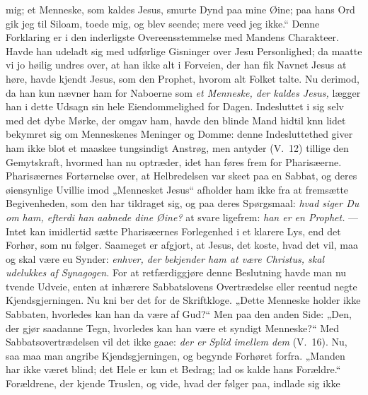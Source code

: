 \documentclass[12pt,a4paper]{book}
\begin{document}
mig; et Menneske, som kaldes Jesus, smurte Dynd paa mine Øine; paa hans Ord gik jeg til
Siloam, toede mig, og blev seende; mere veed jeg ikke.“ Denne Forklaring er i den
inderligste Overeensstemmelse med Mandens Charakteer. Havde han udeladt sig med udførlige
Gisninger over Jesu Personlighed; da maatte vi jo høilig undres over, at han ikke alt i
Forveien, der han fik Navnet Jesus at høre, havde kjendt Jesus, som den Prophet, hvorom alt
Folket talte. Nu derimod, da han kun nævner ham for Naboerne som \emph{et Menneske, der
kaldes Jesus,} lægger han i dette Udsagn sin hele Eiendommelighed for Dagen. Indesluttet i
sig selv med det dybe Mørke, der omgav ham, havde den blinde Mand hidtil knn lidet
bekymret sig om Menneskenes Meninger og Domme: denne Indesluttethed giver ham ikke blot et
maaskee tungsindigt Anstrøg, men antyder (V.\ 12) tillige den Gemytskraft, hvormed han nu
optræder, idet han føres frem for Pharisæerne. Pharisæernes Fortørnelse over, at
Helbredelsen var skeet paa en Sabbat, og deres øiensynlige Uvillie imod „Mennesket Jesus“
afholder ham ikke fra at fremsætte Begivenheden, som den har tildraget sig, og paa deres
Spørgsmaal: \emph{hvad siger Du om ham, efterdi han aabnede dine Øine?} at svare ligefrem:
\emph{han er en Prophet.} --- Intet kan imidlertid sætte Pharisæernes Forlegenhed i et
klarere Lys, end det Forhør, som nu følger. Saameget er afgjort, at Jesus, det koste, hvad
det vil, maa og skal være eu Synder: \emph{enhver, der bekjender ham at være Christus,
skal udelukkes af Synagogen.} For at retfærdiggjøre denne Beslutning havde man nu tvende
Udveie, enten at inhærere Sabbatslovens Overtrædelse eller reentud negte
Kjendsgjerningen. Nu kni\-%
ber det for de Skriftkloge. „Dette Menneske holder ikke Sabbaten, hvorledes kan han da
være af Gud?“ Men paa den anden Side: „Den, der gjør saadanne Tegn, hvorledes kan han
være et syndigt Menneske?“ Med Sabbatsovertrædelsen vil det ikke gaae: \emph{der er Splid
imellem dem} (V.\ 16). Nu, saa maa man angribe Kjendsgjerningen, og begynde Forhøret
forfra. „Manden har ikke været blind; det Hele er kun et Bedrag; lad os kalde hans
Forældre.“ Forældrene, der kjende Truslen, og vide, hvad der følger paa, indlade sig ikke
\end{document}
